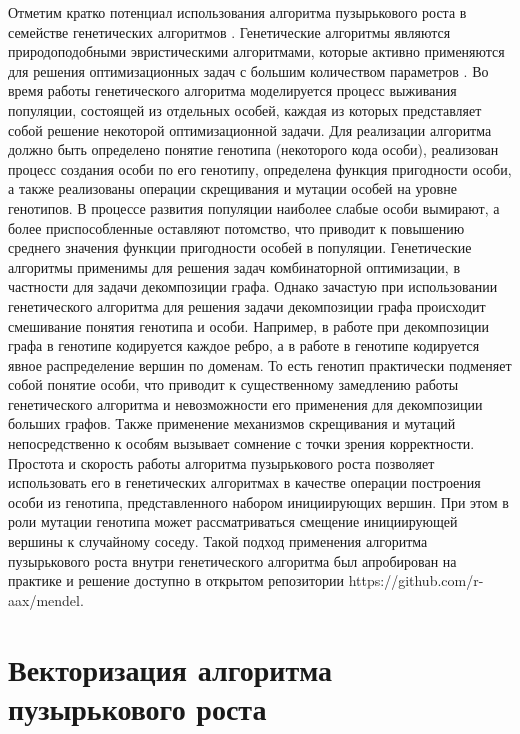 \documentclass[
11pt,%
tightenlines,%
twoside,%
onecolumn,%
nofloats,%
nobibnotes,%
nofootinbib,%
superscriptaddress,%
noshowpacs,%
centertags]%
{revtex4}
\begin{document}
Отметим кратко потенциал использования алгоритма пузырькового роста в семействе генетических алгоритмов \cite{20Katosh}.
Генетические алгоритмы являются природоподобными эвристическими алгоритмами, которые активно применяются для решения оптимизационных задач с большим количеством параметров \cite{21Wirayanti}.
Во время работы генетического алгоритма моделируется процесс выживания популяции, состоящей из отдельных особей, каждая из которых представляет собой решение некоторой оптимизационной задачи.
Для реализации алгоритма должно быть определено понятие генотипа (некоторого кода особи), реализован процесс создания особи по его генотипу, определена функция пригодности особи, а также реализованы операции скрещивания и мутации особей на уровне генотипов.
В процессе развития популяции наиболее слабые особи вымирают, а более приспособленные оставляют потомство, что приводит к повышению среднего значения функции пригодности особей в популяции.
Генетические алгоритмы применимы для решения задач комбинаторной оптимизации, в частности для задачи декомпозиции графа.
Однако зачастую при использовании генетического алгоритма для решения задачи декомпозиции графа происходит смешивание понятия генотипа и особи.
Например, в работе \cite{22Chaouche} при декомпозиции графа в генотипе кодируется каждое ребро, а в работе \cite{23Li} в генотипе кодируется явное распределение вершин по доменам.
То есть генотип практически подменяет собой понятие особи, что приводит к существенному замедлению работы генетического алгоритма и невозможности его применения для декомпозиции больших графов.
Также применение механизмов скрещивания и мутаций непосредственно к особям вызывает сомнение с точки зрения корректности.
Простота и скорость работы алгоритма пузырькового роста позволяет использовать его в генетических алгоритмах в качестве операции построения особи из генотипа, представленного набором инициирующих вершин.
При этом в роли мутации генотипа может рассматриваться смещение инициирующей вершины к случайному соседу.
Такой подход применения алгоритма пузырькового роста внутри генетического алгоритма был апробирован на практике и решение доступно в открытом репозитории https://github.com/r-aax/mendel.

\section{Векторизация алгоритма пузырькового роста}
\end{document}
